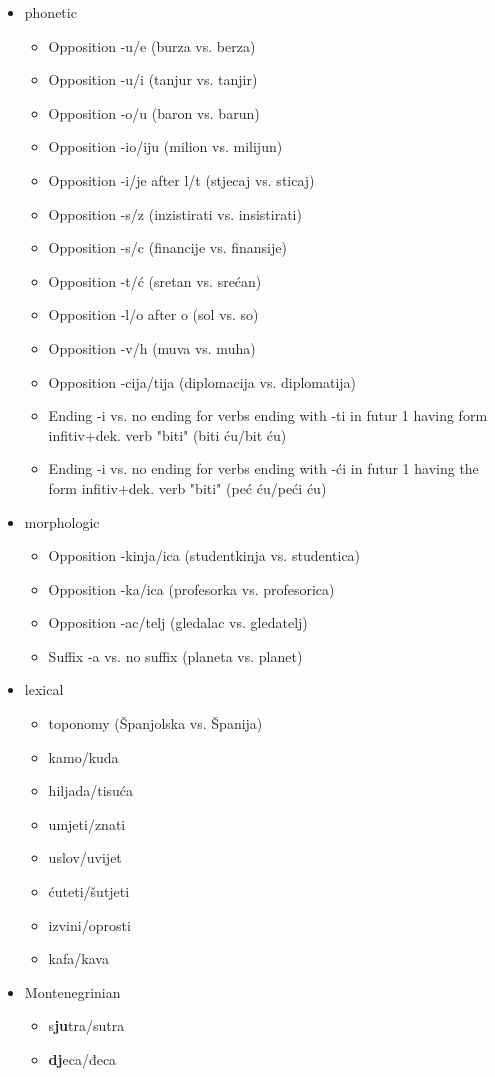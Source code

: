 \documentclass[a4paper]{article}
\begin{document}
\begin{itemize}
\item phonetic
\begin{itemize}
\item Opposition -u/e (burza vs. berza)
\item Opposition -u/i (tanjur vs. tanjir)
\item Opposition -o/u (baron vs. barun)
\item Opposition -io/iju (milion vs. milijun)
\item Opposition -i/je after l/t	 (stjecaj vs. sticaj)
\item Opposition -s/z (inzistirati vs. insistirati)
\item Opposition -s/c (financije vs. finansije)
\item Opposition -t/ć (sretan vs. srećan)
\item Opposition -l/o after o (sol vs. so)
\item Opposition -v/h (muva vs. muha)
\item Opposition -cija/tija (diplomacija vs. diplomatija)
\item Ending -i vs. no ending for verbs ending with -ti in futur 1 having form infitiv+dek. verb "biti" (biti ću/bit ću)
\item Ending -i vs. no ending for verbs ending with -ći in futur 1 having the form infitiv+dek. verb "biti" (peć ću/peći ću)


\end{itemize}
\item morphologic
\begin{itemize}
\item Opposition -kinja/ica (studentkinja vs. studentica)
\item Opposition -ka/ica (profesorka vs. profesorica)
\item Opposition -ac/telj (gledalac vs. gledatelj)
\item Suffix -a vs. no suffix (planeta vs. planet)
\end{itemize}
\item lexical
\begin{itemize}
\item toponomy (Španjolska vs. Španija)
\item kamo/kuda %
\item hiljada/tisuća
\item umjeti/znati
\item uslov/uvijet
\item ćuteti/šutjeti
\item izvini/oprosti
\item kafa/kava
\end{itemize}
\item Montenegrinian
\begin{itemize}
\item s\textbf{ju}tra/sutra
\item \textbf{dj}eca/đeca
\end{itemize}
\end{itemize}
\end{document}
